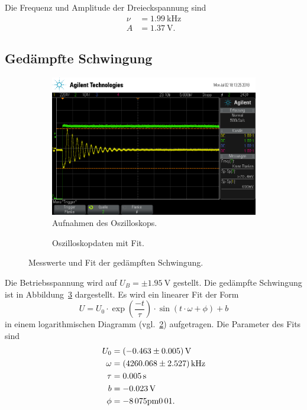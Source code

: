 Die Frequenz und Amplitude der Dreieckspannung sind
\begin{align*}
  \nu &= \SI{1.99}{\kilo\hertz} \\
  A &= \SI{1.37}{\volt}.
\end{align*}

\subsection{Ged\"ampfte Schwingung}

\begin{figure}[ht]
  \centering
  \begin{subfigure}{\textwidth}
    \centering
    \includegraphics[height=0.3\textheight]{data/scope_275.png}
    \caption{Aufnahmen des Oszilloskops.}%
    \label{fig:gedaempft_oszilloskop}
  \end{subfigure}
  \begin{subfigure}{\textwidth}
    \centering
    
    \caption{Oszilloskopdaten mit Fit.}%
    \label{fig:gedaempft_fit}
  \end{subfigure}
  \caption{Messwerte und Fit der gedämpften Schwingung.}%
  \label{fig:gedaempft}
\end{figure}

Die Betriebsspannung wird auf $U_B = \pm \SI{1.95}{\volt}$ gestellt.
Die gedämpfte Schwingung ist in Abbildung~\ref{fig:gedaempft} dargestellt.
Es wird ein linearer Fit der Form
\begin{equation}
U = U_0 \cdot \exp{\left(\frac{-t}{\tau}\right)} \cdot \sin{\left(t \cdot \omega  + \phi\right)} + b
\end{equation}
in einem logarithmischen Diagramm (vgl.~\ref{fig:gedaempft_fit}) aufgetragen.
Die Parameter des Fits sind
\begin{align*}
  U_0 &= \SI{-0.463 \pm 0.005}{\volt} \\
  \omega &= \SI{4260.068 \pm 2.527}{\kilo\hertz} \\
  \tau &= \SI{0.005 \pm 0.0}{\second} \\
  b &= \SI{-0.023 \pm 0.0}{\volt} \\
  \phi &= \si{-8.075 \pm 0.01}.
\end{align*}
